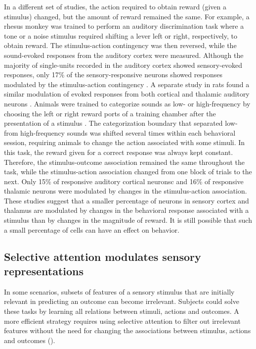 In a different set of studies, the action required to obtain reward (given a stimulus) changed, but the amount of reward remained the same.
%
For example, a rhesus monkey was trained to perform an auditory discrimination task where a tone or a noise stimulus required shifting a lever left or right, respectively, to obtain reward. The stimulus-action contingency was then reversed, while the sound-evoked responses from the auditory cortex were measured. Although the majority of single-units recorded in the auditory cortex showed sensory-evoked responses, only 17\% of the sensory-responsive neurons showed responses modulated by the stimulus-action contingency \citep{Vaadia1982}. A separate study in rats found a similar modulation of evoked responses from both cortical and thalamic auditory neurons \citep{Jaramillo2014a}. Animals were trained to categorize sounds as low- or high-frequency by choosing the left or right reward ports of a training chamber after the presentation of a stimulus \citep{Jaramillo2014b}. The categorization boundary that separated low- from high-frequency sounds was shifted several times within each behavioral session, requiring animals to change the action associated with some stimuli. In this task, the reward given for a correct response was always kept constant. Therefore, the stimulus-outcome association remained the same throughout the task, while the stimulus-action association changed from one block of trials to the next. Only 15\% of responsive auditory cortical neuronsc and 16\% of responsive thalamic neurons were modulated by changes in the stimulus-action association. 
%
These studies suggest that a smaller percentage of neurons in sensory cortex and thalamus are modulated by changes in the behavioral response associated with a stimulus than by changes in the magnitude of reward. It is still possible that such a small percentage of cells can have an effect on behavior.

\subsection{Selective attention modulates sensory representations}

In some scenarios, subsets of features of a sensory stimulus that are initially relevant in predicting an outcome can become irrelevant. Subjects could solve these tasks by learning all relations between stimuli, actions and outcomes. A more efficient strategy requires using selective attention to filter out irrelevant features without the need for changing the associations between stimulus, actions and outcomes (\fig{\FeatureRelevance}).

